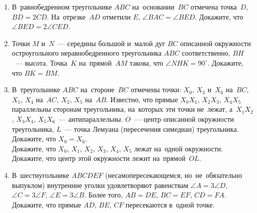 \begin{enumerate}
\item
В~равнобедренном треугольнике $ABC$ на~основании~$BC$ отмечена точка~$D$,
$BD = 2 CD$.
На~отрезке~$AD$ отметили $E$, $\angle BAC = \angle BED$.
Докажите, что $\angle BED = 2 \angle CED$.

\item
Точки $M$ и~$N$~— середины большой и~малой дуг $BC$ описанной окружности
остроугольного неравнобедренного треугольника $ABC$ соответственно,
$BH$~— высота.
Точка~$K$ на~прямой~$AM$ такова, что $\angle NHK = 90^{\circ}$.
Докажите, что $BK = BM$.

\item
В~треугольнике $ABC$ на~стороне~$BC$ отмечены точки:
$X_0$, $X_3$ и~$X_6$ на~$BC$,
$X_1$, $X_4$ на~$AC$, $X_2$, $X_5$ на~$AB$.
Известно, что прямые $X_0 X_1$, $X_2 X_3$, $X_4 X_5$ параллельны сторонам
треугольника, на~которых эти точки не~лежат,
а~$X_1 X_2$, $X_3 X_4$, $X_5 X_6$~— антипараллельны.
$O$~— центр описанной окружности треугольника, $L$~— точка Лемуана
(пересечения симедиан) треугольника.
\\
\subproblem
Докажите, что $X_0 = X_6$.
\\
\subproblem
Докажите, что $X_0$, $X_1$, $X_2$, $X_3$, $X_4$, $X_5$ лежат на~одной
окружности.
\\
\subproblem
Докажите, что центр этой окружности лежит на~прямой~$OL$.

\item
В~шестиугольнике $ABCDEF$ (несамопересекающемся, но~не~обязательно выпуклом)
внутренние уголки удовлетворяют равенствам
$\angle A = 3 \angle D$, $\angle C = 3 \angle F$, $\angle E = 3 \angle B$.
Более того, $AB = DE$, $BC = EF$, $CD = FA$.
Докажите, что прямые $AD$, $BE$, $CF$ пересекаются в~одной точке.

\end{enumerate}

